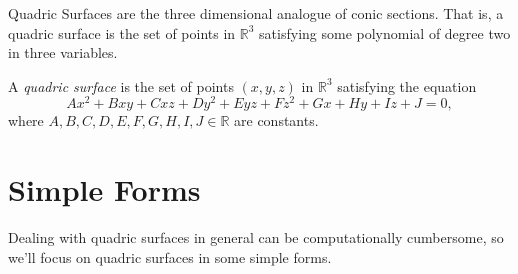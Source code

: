 \documentclass{ximera}
\begin{document}
Quadric Surfaces are the three dimensional analogue of conic sections. That is, a quadric surface is the set of points in $\mathbb{R}^3$ satisfying some polynomial of degree two in three variables.

\begin{definition}
A \emph{quadric surface} is the set of points $(x,y,z)$ in $\mathbb{R}^3$ satisfying the equation
\[
Ax^2 + Bxy + Cxz + Dy^2 + Eyz + Fz^2 +Gx + Hy + Iz + J = 0,
\]
where $A,B,C,D,E,F,G,H,I,J\in\mathbb{R}$ are constants.
\end{definition}

\section{Simple Forms}

Dealing with quadric surfaces in general can be computationally cumbersome, so we'll focus on quadric surfaces in some simple forms.
\end{document}
